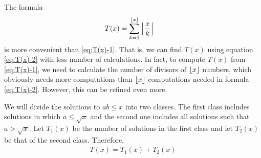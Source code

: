 The formula
\begin{align}
	T(x)
		& = \sum_{k=1}^{\left\lfloor{x}\right\rfloor}\left\lfloor{\frac{x}{k}}\right\rfloor\label{eq:T(x)-2}
\end{align}
is more convenient than \ref{eq:T(x)-1}. That is, we can find $T(x)$ using equation \ref{eq:T(x)-2} with less number of calculations. In fact, to compute $T(x)$ from \ref{eq:T(x)-1}, we need to calculate the number of divisors of $\left\lfloor{x}\right\rfloor$ numbers, which obviously needs more computations than $\left\lfloor{x}\right\rfloor$  computations needed in formula \ref{eq:T(x)-2}. However, this can be refined even more.

We will divide the solutions to $ab \leq x$ into two classes. The first class includes solutions in which $a \leq \sqrt x$ and the second one includes all solutions such that $a > \sqrt x$. Let $T_1(x)$ be the number of solutions in the first class and let $T_2(x)$ be that of the second class. Therefore,
\begin{align*}
	T(x) = T_1(x) + T_2(x)
\end{align*}

